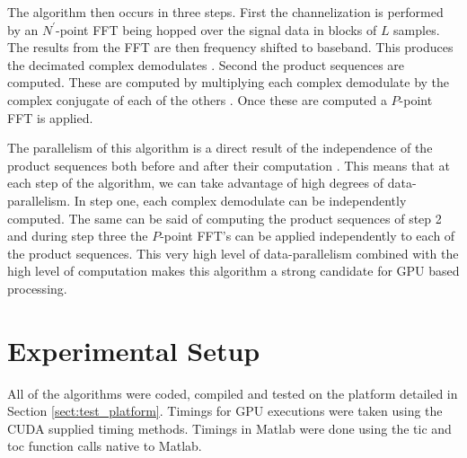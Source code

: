 The algorithm then occurs in three steps.  First the channelization is performed by an $N^\prime$-point FFT being hopped over the signal data in blocks of $L$ samples.  The results from the FFT are then frequency shifted to baseband.  This produces the decimated complex demodulates \cite{RobBroLoo91}.  Second the product sequences are computed.  These are computed by multiplying each complex demodulate by the complex conjugate of each of the others \cite{Costa96}.  Once these are computed a $P$-point FFT is applied.

The parallelism of this algorithm is a direct result of the independence of the product sequences both before and after their computation \cite{RobBroLoo91}.  This means that at each step of the algorithm, we can take advantage of high degrees of data-parallelism.  In step one, each complex demodulate can be independently computed.  The same can be said of computing the product sequences of step 2 and during step three the $P$-point FFT's can be applied independently to each of the product sequences.  This very high level of data-parallelism combined with the high level of computation makes this algorithm a strong candidate for GPU based processing.


\section{Experimental Setup}
All of the algorithms were coded, compiled and tested on the platform detailed in Section \ref{sect:test_platform}.  Timings for GPU executions were taken using the CUDA supplied timing methods.  Timings in Matlab were done using the tic and toc function calls native to Matlab.


